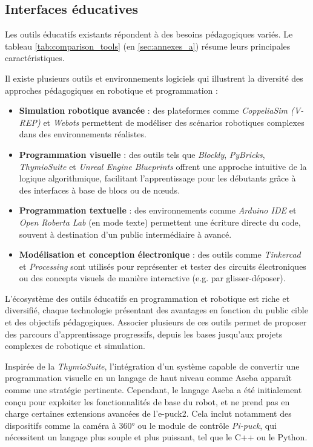 \subsection{Interfaces éducatives} \label{sec:interfaces_éducatives}

Les outils éducatifs existants répondent à des besoins pédagogiques variés.
Le tableau \ref{tab:comparison_tools} (en \autoref{sec:annexes_a}) résume leurs principales caractéristiques.

Il existe plusieurs outils et environnements logiciels qui illustrent la diversité des approches pédagogiques en robotique et programmation :

\begin{itemize}
    \item \textbf{Simulation robotique avancée} : des plateformes comme \textit{CoppeliaSim (V-REP)} et \textit{Webots} permettent de modéliser des scénarios robotiques complexes dans des environnements réalistes.
    
    \item \textbf{Programmation visuelle} : des outils tels que \textit{Blockly}, \textit{PyBricks}, \textit{ThymioSuite} et \textit{Unreal Engine Blueprints} offrent une approche intuitive de la logique algorithmique, facilitant l’apprentissage pour les débutants grâce à des interfaces à base de blocs ou de nœuds.

    \item \textbf{Programmation textuelle} : des environnements comme \textit{Arduino IDE} et \textit{Open Roberta Lab} (en mode texte) permettent une écriture directe du code, souvent à destination d’un public intermédiaire à avancé.

    \item \textbf{Modélisation et conception électronique} : des outils comme \textit{Tinkercad} et \textit{Processing} sont utilisés pour représenter et tester des circuits électroniques ou des concepts visuels de manière interactive (e.g. par glisser-déposer).
\end{itemize}

L'écosystème des outils éducatifs en programmation et robotique est riche et diversifié, chaque technologie présentant des avantages en fonction du public cible et des objectifs pédagogiques.
Associer plusieurs de ces outils permet de proposer des parcours d’apprentissage progressifs, depuis les bases jusqu’aux projets complexes de robotique et simulation.

Inspirée de la \textit{ThymioSuite}, l’intégration d’un système capable de convertir une programmation visuelle en un langage de haut niveau comme Aseba apparaît comme une stratégie pertinente.
Cependant, le langage Aseba a été initialement conçu pour exploiter les fonctionnalités de base du robot, et ne prend pas en charge certaines extensions avancées de l’e-puck2. 
Cela inclut notamment des dispositifs comme la caméra à 360° ou le module de contrôle \textit{Pi-puck}, qui nécessitent un langage plus souple et plus puissant, tel que le C++ ou le Python.

